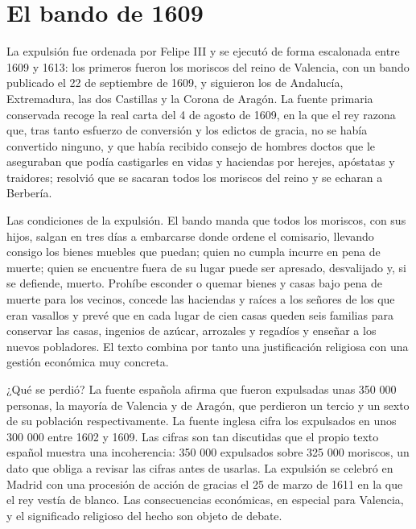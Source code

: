 \documentclass{book}
\begin{document}

\section{El bando de 1609}

La expulsión fue ordenada por Felipe III y se ejecutó de forma escalonada entre 1609 y 1613: los primeros fueron los moriscos del reino de Valencia, con un bando publicado el 22 de septiembre de 1609, y siguieron los de Andalucía, Extremadura, las dos Castillas y la Corona de Aragón. La fuente primaria conservada recoge la real carta del 4 de agosto de 1609, en la que el rey razona que, tras tanto esfuerzo de conversión y los edictos de gracia, no se había convertido ninguno, y que había recibido consejo de hombres doctos que le aseguraban que podía castigarles en vidas y haciendas por herejes, apóstatas y traidores; resolvió que se sacaran todos los moriscos del reino y se echaran a Berbería.


Las condiciones de la expulsión. El bando manda que todos los moriscos, con sus hijos, salgan en tres días a embarcarse donde ordene el comisario, llevando consigo los bienes muebles que puedan; quien no cumpla incurre en pena de muerte; quien se encuentre fuera de su lugar puede ser apresado, desvalijado y, si se defiende, muerto. Prohíbe esconder o quemar bienes y casas bajo pena de muerte para los vecinos, concede las haciendas y raíces a los señores de los que eran vasallos y prevé que en cada lugar de cien casas queden seis familias para conservar las casas, ingenios de azúcar, arrozales y regadíos y enseñar a los nuevos pobladores. El texto combina por tanto una justificación religiosa con una gestión económica muy concreta.


¿Qué se perdió?
La fuente española afirma que fueron expulsadas unas 350 000 personas, la mayoría de Valencia y de Aragón, que perdieron un tercio y un sexto de su población respectivamente. La fuente inglesa cifra los expulsados en unos 300 000 entre 1602 y 1609. Las cifras son tan discutidas que el propio texto español muestra una incoherencia: 350 000 expulsados sobre 325 000 moriscos, un dato que obliga a revisar las cifras antes de usarlas. La expulsión se celebró en Madrid con una procesión de acción de gracias el 25 de marzo de 1611 en la que el rey vestía de blanco. Las consecuencias económicas, en especial para Valencia, y el significado religioso del hecho son objeto de debate.
\end{document}
